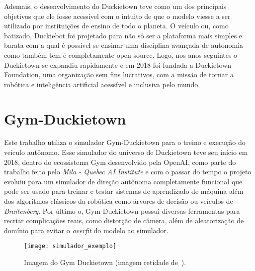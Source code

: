 Ademais, o desenvolvimento do Duckietown teve como um dos principais objetivos que ele fosse acessível com o intuito de que o modelo viesse a ser utilizado por instituições de ensino de todo o planeta. O veículo ou, como batizado, Duckiebot foi projetado para não só ser a plataforma mais simples e barata com a qual é possível se ensinar uma disciplina avançada de autonomia como também tem é completamente open source. Logo, nos anos seguintes o Duckietown se expandiu rapidamente e em 2018 foi fundada a Duckietown Foundation, uma organização sem fins lucrativos, com a missão de tornar a robótica e inteligência artificial acessível e inclusiva pelo mundo. 

\section{Gym-Duckietown}

Este trabalho utiliza o simulador Gym-Duckietown\citep{gym-duckietown} para o treino e execução do veículo autônomo. Esse simulador do universo de Duckietown teve seu início em 2018, dentro do ecossistema Gym desenvolvido pela OpenAI\citep{1606.01540}, como parte do trabalho feito pelo \textit{Mila - Quebec AI Institute} e com o passar do tempo o projeto evoluiu para um simulador de direção autônoma completamente funcional que pode ser usado para treinar e testar sistemas de aprendizado de máquina além dos algoritmos clássicos da robótica como árvores de decisão ou veículos de \textit{Braitenberg}. Por último o, Gym-Duckietown possui diversas ferramentas para recriar complicações reais, como distorção de câmera, além de aleatorização de domínio para evitar o \textit{overfit} do modelo ao simulador.

\begin{figure}
	\centering
	\texttt{[image: simulador\_exemplo]}
	\caption{Imagem do Gym Duckietown (imagem retidade de~\citep{gym-duckietown}).\label{fig:simulador_exemplo}}
\end{figure}


